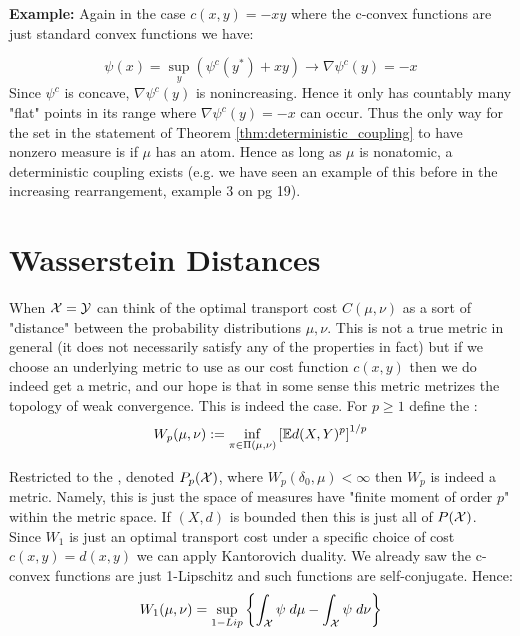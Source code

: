 \noindent \textbf{Example:} Again in the case $c(x,y) = -xy$ where the c-convex functions are just standard convex functions we have:

\[\psi(x) = \sup_{y} (\psi^c(y^*) + xy) \to \nabla \psi^c(y) = -x\]
%
\noindent Since $\psi^c$ is concave, $\nabla \psi^c(y)$ is nonincreasing. Hence it only has countably many "flat" points in its range where $\nabla\psi^c(y) = -x$ can occur. Thus the only way for the set in the statement of Theorem \ref{thm:deterministic_coupling} to have nonzero measure is if $\mu$ has an atom. Hence as long as $\mu$ is nonatomic, a deterministic coupling exists (e.g. we have seen an example of this before in the increasing rearrangement, example 3 on pg 19).


\newpage
\section{Wasserstein Distances}

\noindent When ${\mathcal X} = {\mathcal Y}$ can think of the optimal transport cost $C(\mu, \nu)$ as a sort of "distance" between the probability distributions $\mu, \nu$. This is not a true metric in general (it does not necessarily satisfy any of the properties in fact) but if we choose an underlying metric to use as our cost function $c(x,y)$ then we do indeed get a metric, and our hope is that in some sense this metric metrizes the topology of weak convergence. This is indeed the case. For $p \geq 1$ define the :
\begin{equation}
    W_p(\mu, \nu) := \inf_{\pi \in \Pi(\mu, \nu)} \left[\mathbb{E} d(X,Y)^p \right]^{1/p}
    \label{eqn:wasserstein_distance}
\end{equation}

\noindent Restricted to the , denoted $P_p({\mathcal X})$, where $W_p(\delta_0, \mu) < \infty$ then $W_p$ is indeed a metric. Namely, this is just the space of measures have "finite moment of order $p$" within the metric space. If $(X,d)$ is bounded then this is just all of $P({\mathcal X})$.\\

\noindent Since $W_1$ is just an optimal transport cost under a specific choice of cost $c(x,y) = d(x,y)$ we can apply Kantorovich duality. We already saw the c-convex functions are just 1-Lipschitz and such functions are self-conjugate. Hence:
%
\[W_1(\mu, \nu) = \sup_{1-Lip} \left\{ \int_{\mathcal X} \psi \; d\mu - \int_{\mathcal X} \psi \; d\nu \right\}\]



